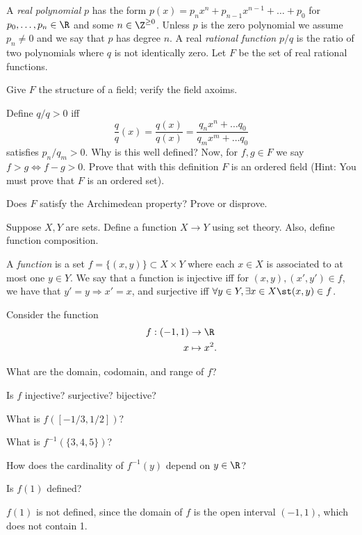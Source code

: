 \documentclass{assignment}
\begin{document}
\begin{question}[2]
  A \emph{real polynomial} $p$ has the form $p(x) = p_nx^n + p_{n-1}x^{n-1} + \ldots + p_0$ for $p_0,
\ldots, p_n\in\R$ and some $n\in\Z^{\geq0}$. Unless $p$ is the zero polynomial we assume $p_n\neq 0$ 
and we say that $p$ has degree $n$. A real \emph{rational function} $p/q$ is the ratio of two polynomials
where $q$ is not identically zero. Let $F$ be the set of real rational functions. \\

\begin{qparts}
  \item Give $F$ the structure of a field; verify the field axoims.
  \item Define $q/q >0$ iff $$\frac{q}{q}(x) = \frac{q(x)}{q(x)} = \frac{q_nx^n + \ldots q_0}{q_mx^m
 + \ldots q_0}$$ satisfies $p_n/q_m > 0.$ Why is this well defined? Now, for $f,g\in F$ we say $f > g
\iff f- g > 0$. Prove that with this definition $F$ is an ordered field (Hint: You must prove that $F$
is an ordered set).
  \item Does $F$ satisfy the Archimedean property? Prove or disprove.
\end{qparts}
\end{question}

\begin{question}[3]
  Suppose $X,Y$ are sets. Define a function $X \to Y$ using set theory. Also, define function composition.
\end{question}
A \emph{function} is a set $f = \{(x,y)\} \subset X\times Y$ where each $x\in X$ is associated to at most one 
$y\in Y$. We say that a function is injective iff for $(x, y), (x', y')\in f$, we have that $y' = y \Rightarrow
x' = x$, and surjective iff $\forall y\in Y, \exists x\in X \st (x,y)\in f$.

\begin{question}[4]
  Consider the function 
  \begin{align*}
    f: (-1, 1) &\to \R \\
             x &\mapsto x^2.
  \end{align*}
  \begin{qparts}
    \item What are the domain, codomain, and range of $f$? 
    \item Is $f$ injective? surjective? bijective?
    \item What is $f([-1/3, 1/2])?$
    \item What is $f^{-1}(\{3,4,5\})$?
    \item How does the cardinality of $f^{-1}(y)$ depend on $y\in\R$?
    \item Is $f(1)$ defined?
  \end{qparts}
\end{question}
\begin{qparts}
  \item $f(1)$ is not defined, since the domain of $f$ is the open interval $(-1, 1)$, which does not
        contain 1.
\end{qparts}
\end{document}
